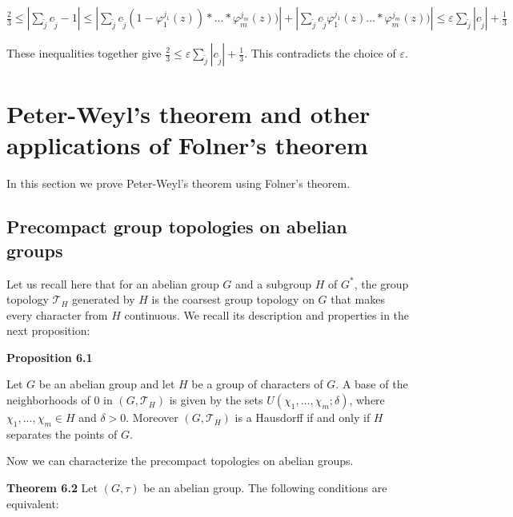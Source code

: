 \documentclass[12pt]{article}
\begin{document}
    $\frac{2}{3} \leq |\sum_\tilde{j} c_{\tilde{j}} - 1| \leq |\sum_{\tilde{j}} c_{\tilde{j}} (1 - \varphi^{j_1}_1(z)) * ... * \varphi^{j_m}_m(z))| + |\sum_{\tilde{j}} c_{\tilde{j}} \varphi^{j_1}_1 (z) ... * \varphi^{j_m}_m(z))| \leq \varepsilon \sum_\tilde{j} |c_\tilde{j}| + \frac{1}{3}$


    These inequalities together give $\frac{2}{3} \leq \varepsilon \sum_{\tilde{j}}|c_{\tilde{j}}| + \frac{1}{3}$. This contradicts the choice of $\varepsilon$.


\section{Peter-Weyl's theorem and other applications of Folner's theorem}


In this section we prove Peter-Weyl's theorem using Folner's theorem.


\subsection{Precompact group topologies on abelian groups}


    Let us recall here that for an abelian group $G$ and a subgroup $H$ of $G^*$, the group topology $\mathcal{T}_H$ generated by $H$
is the coarsest group topology on $G$ that makes every character from $H$ continuous. We recall its description
and properties in the next proposition:


\textbf{Proposition 6.1}


    Let $G$ be an abelian group and let $H$ be a group of characters of $G$. A base of the neighborhoods
of 0 in $(G, \mathcal{T}_H)$ is given by the sets $U(\chi_1, . . . , \chi_m; \delta)$, where $\chi_1, . . . , \chi_m \in H$ and $\delta > 0$. Moreover $(G, \mathcal{T}_H)$ is a
Hausdorff if and only if $H$ separates the points of $G$.


    Now we can characterize the precompact topologies on abelian groups.


\textbf{Theorem 6.2} Let $(G, \tau)$ be an abelian group. The following conditions are equivalent:
\end{document}
